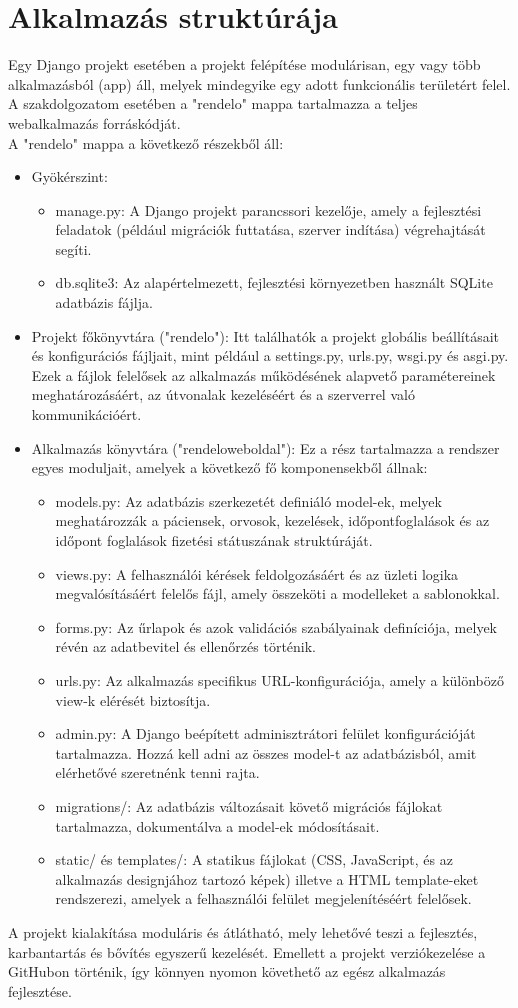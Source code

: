 \chapter{Alkalmazás struktúrája}
\label{chap:fejezet2}

Egy Django projekt esetében a projekt felépítése modulárisan, egy vagy több alkalmazásból (app) áll, melyek mindegyike egy adott funkcionális területért felel. A szakdolgozatom esetében a "rendelo" mappa tartalmazza a teljes webalkalmazás forráskódját.\\
A "rendelo" mappa a következő részekből áll:

\begin{itemize}
	\item Gyökérszint:
	\begin{itemize}
		\item manage.py: A Django projekt parancssori kezelője, amely a fejlesztési feladatok (például migrációk futtatása, szerver indítása) végrehajtását segíti.
		\item db.sqlite3: Az alapértelmezett, fejlesztési környezetben használt SQLite adatbázis fájlja.
	\end{itemize}
	\item Projekt főkönyvtára ("rendelo"): Itt találhatók a projekt globális beállításait és konfigurációs fájljait, mint például a settings.py, urls.py, wsgi.py és asgi.py. Ezek a fájlok felelősek az alkalmazás működésének alapvető paramétereinek meghatározásáért, az útvonalak kezeléséért és a szerverrel való kommunikációért.
	\item Alkalmazás könyvtára ("rendeloweboldal"): Ez a rész tartalmazza a rendszer egyes moduljait, amelyek a következő fő komponensekből állnak:
	\begin{itemize}
		\item models.py: Az adatbázis szerkezetét definiáló model-ek, melyek meghatározzák a páciensek, orvosok, kezelések, időpontfoglalások és az időpont foglalások fizetési státuszának struktúráját.
		\item views.py: A felhasználói kérések feldolgozásáért és az üzleti logika megvalósításáért felelős fájl, amely összeköti a modelleket a sablonokkal.
		\item forms.py: Az űrlapok és azok validációs szabályainak definíciója, melyek révén az adatbevitel és ellenőrzés történik.
		\item urls.py: Az alkalmazás specifikus URL-konfigurációja, amely a különböző view-k elérését biztosítja.
		\item admin.py: A Django beépített adminisztrátori felület konfigurációját tartalmazza. Hozzá kell adni az összes model-t az adatbázisból, amit elérhetővé szeretnénk tenni rajta.
		\item migrations/: Az adatbázis változásait követő migrációs fájlokat tartalmazza, dokumentálva a model-ek módosításait.
		\item static/ és templates/: A statikus fájlokat (CSS, JavaScript, és az alkalmazás designjához tartozó képek) illetve a HTML template-eket rendszerezi, amelyek a felhasználói felület megjelenítéséért felelősek.
	\end{itemize}
\end{itemize}

A projekt kialakítása moduláris és átlátható, mely lehetővé teszi a fejlesztés, karbantartás és bővítés egyszerű kezelését.
Emellett a projekt verziókezelése a GitHubon történik, így könnyen nyomon követhető az egész alkalmazás fejlesztése.